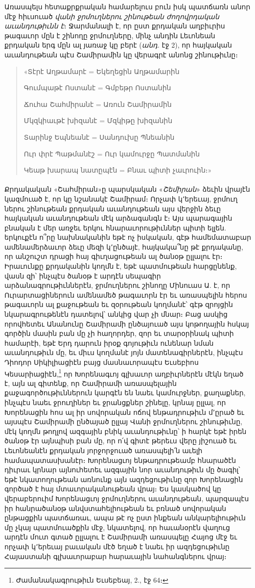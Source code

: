 \documentclass{article}
\begin{document}
{Առասպելս հետաքրքրական համարելուս բուն իսկ պատճառն անոր մէջ հիւսուած \emph{վանի ջրմուղներու շինութեան ժողովրդական աւանդութիւնն է}։ Ջարմանալի է, որ ըստ քրդական աղբիւրիս թագաւոր մըն է շինողը ջրմուղները, մինչ անդին Լեւոնեան քրդական երգ մըն ալ յառաջ կը բերէ (\emph{անդ.} էջ 2), որ հայկական աւանդութեան պէս Շամիրամին կը վերագրէ անոնց շինութիւնը։
\begin{quotation}
\arm
\scriptsize
«Տէրէ Աղթամարէ = Եկեղեցին Աղթամարին

Գումպաթէ Ոստանէ = Գմբեթր Ոստանին

Ճուհա Շահմիրանէ = Առուն Շամիրամին

Մկզկիաւթէ խիզանէ = Մզկիթը խիզանին

Տարինջ Եպնեանէ = Սանդուխը Պնեանին

Ուր փրէ Պաթմանէշ = Ուր կամուրջը Պատմանին

Կեաթ խարապ նատըպէն = Բնաւ պիտի չաւրուին։»
\end{quotation}
\paragraph{}
Քրդակական «Շահմիրան»ը պարսկական «\emph{Շեմիրան}» ձեւին վրայէն կազմուած է, որ կը նշանակէ Շամիրամ։ Որչափ կ՚երեւայ, ջրմուղ ներու շինութեան քրդական աւանդութեան այս վերջին ձեւը հայկական աւանդութեան մէկ արձագանգն է։ Այս պարագային բնական է մեր առջեւ երկու հնարաւորութիւններ պիտի ելլեն. երկուքէն ո՞րը նախնականին եթէ ոչ իսկական, գէթ համեմատաբար ամենամերձաւոր ձեւը մեզի կ՚ընծայէ, հայկակա՞նը թէ քրդականը, որ անշուշտ դրացի հայ գիւղացութեան ալ ծանօթ ըլլալու էր։ Իրաւունքը քրդականին կողմն է, եթէ պատմութեան հարցընենք, վասն զի՝ ինչպէս ծանօթ է արդէն սեպագիր արձանագրութիւններէն, ջրմուղներու շինողը Մինուաս Ա. է, որ Ուրարտացիներուն ամենամեծ թագաւորն էր եւ առասպելին հերոս թագաւորն ալ քաջութեան եւ զօրութեան կողմանէ՝ գէթ զրոյցին նկարագրութենէն դատելով՝ անկից վար չի մնար։ Բաց ասկից որովհետեւ Անանունը Շամիրամի ընծայուած այս կոթողային հսկայ գործին մասին բան մը չի հաղորդեր, զոր եւ տարօրինակ պիտի համարէի, եթէ Երդ դարուն իրօք գոյութիւն ունենար նման աւանդութիւն մը, եւ միւս կողմանէ յոյն մատենագիրներէն, ինչպէս Դիոդոր Սիկիլիացիէն բայց մասնաւորապէս Եւսեբիոս Կեսարիացիէն,\footnote{Ժամանակագրութիւն Եւսեբեայ, 2., էջ 64։} որ Խորենագւոյ գլխաւոր աղբիւրներէն մէկն եղած է, այն ալ գիտենք, որ Շամիրամի առասպելային քաջագործութիւններուն կարգէն են նաեւ կամուրջներ, քաղաքներ, ինչպէս նաեւ ջրուղիներ եւ ջրանցքներ շինելը, կրնայ ըլլալ, որ Խորենացին հոս ալ իր սովորական ոճով ենթադրութիւն մ՚ըրած եւ այսպէս Շամիրամի ընծայած ըլլայ Վանի ջրմուղներու շինութիւնը, մէկ կողմն թողլով ազգային բնիկ աւանդութիւնը՝ ի հարկէ եթէ իրեն ծանօթ էր այնպիսի բան մը, որ ո՛վ գիտէ թերեւս վերը յիշուած եւ Լեւոնեանէն քրդական յորջորջուած առասպելի՛ն աւելի համապատասխանէր։ Խորենացւոյ ենթադրութեամբ հնարածէն դիւրաւ կրնար այնուհետեւ ազգային նոր աւանդութիւն մը ծագիլ՝ եթէ նկատողութեան առնունք այն ազդեցութիւնը զոր Խորենացին գործած է հայ մտաւորականութեան վրայ։ Ես կասկածով կը վերաբերուիմ Խորենացւոյ ջրմուղներու աւանդութեան, պարզապէս իր հանրածանօթ անվստահելիութեան եւ բռնած սովորական ընթացքին պատճառաւ, ապա թէ ոչ ըստ ինքեան անկարելիութիւն մը չկայ պատմուածքին մէջ, նկատելով, որ հաւանօրէն վաղուց արդէն մուտ գտած ըլլալու է Շամիրամի առասպելը Հայոց մէջ եւ որչափ կ՚երեւայ բաւական մէծ եղած է նաեւ իր ազդեցութիւնը Հայաստանի գլխաւորաբար հարաւային նահանգներու վրայ։

}
\end{document}
